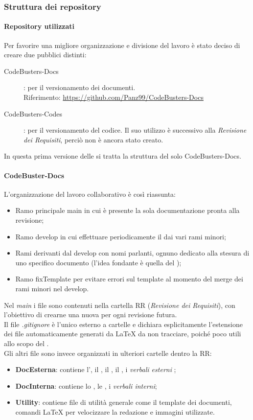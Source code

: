 \subsubsection{Struttura dei repository}
\paragraph{Repository utilizzati}
Per favorire una migliore organizzazione e divisione del lavoro è stato deciso di creare due  pubblici distinti:
\begin{description}
	\item[CodeBusters-Docs] : per il versionamento dei documenti. \\
	Riferimento: \url{https://github.com/Panz99/CodeBusters-Docs}
	\item[CodeBusters-Codes] : per il versionamento del codice. Il suo utilizzo è successivo alla \textit{Revisione dei Requisiti}, perciò non è ancora stato creato. 
\end{description}
In questa prima versione delle \NdPv si tratta la struttura del solo  CodeBusters-Docs. 

\paragraph{CodeBuster-Docs}
L'organizzazione del lavoro collaborativo è così riassunta:
\begin{itemize}
	\item Ramo principale main in cui è presente la sola documentazione pronta alla revisione;	
	\item Ramo develop in cui effettuare periodicamente il  dai vari rami minori;
	\item Rami derivanti dal develop con nomi parlanti, ognuno dedicato alla stesura di uno specifico documento (l'idea fondante è quella del );
	\item Ramo fixTemplate per evitare errori sul template al momento del merge dei rami minori nel develop.
\end{itemize}
Nel \textit{main} i file sono contenuti nella cartella RR (\textit{Revisione dei Requisiti}), con l'obiettivo di crearne una nuova per ogni revisione futura. \\
Il file \textit{.gitignore} è l'unico esterno a cartelle e dichiara esplicitamente l'estensione dei file automaticamente generati da \LaTeX{} da non tracciare, poiché poco utili allo scopo del . \\
Gli altri file sono invece organizzati in ulteriori cartelle dentro la RR:
\begin{itemize}
	\item \textbf{DocEsterna}: contiene l'\AdRv, il \PdPv, il \PdQv, il \Glossariov, i \textit{verbali esterni} ;
	\item \textbf{DocInterna}: contiene lo \SdFv, le \NdPv, i \textit{verbali interni};
	\item \textbf{Utility}: contiene file di utilità generale come il template dei documenti, comandi \LaTeX{} per velocizzare la redazione e immagini utilizzate.
\end{itemize}
	
